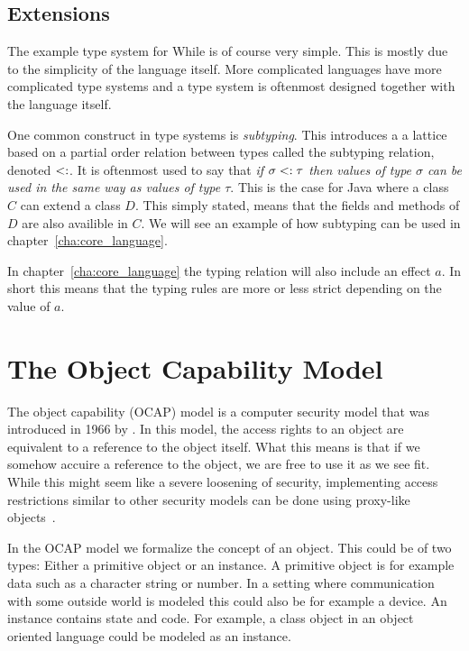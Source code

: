 \subsection{Extensions}
\label{sub:extensions}

The example type system for While is of course very simple. This is mostly due
to the simplicity of the language itself. More complicated languages have more
complicated type systems and a type system is oftenmost designed together 
with the language itself. 

One common construct in type systems is \emph{subtyping}. This introduces a a
lattice based on a partial order relation between types called the subtyping
relation, denoted $<:$.  It is oftenmost used to say that \emph{if $\sigma <:
\tau$ then values of type $\sigma$ can be used in the same way as values of type
$\tau$}. This is the case for Java where a class $C$ can extend a class $D$.
This simply stated, means that the fields and methods of $D$ are also availible
in $C$. We will see an example of how subtyping can be used in
chapter~\ref{cha:core_language}. 

In chapter~\ref{cha:core_language} the typing relation will also include an
effect $a$. In short this means that the typing rules are more or less strict
depending on the value of $a$.

\section{The Object Capability Model}%
\label{sec:the_object_capability_model}

The object capability (OCAP) model is a computer security model that was
introduced in 1966 by \textcite{Dennis-VanHorn66}. In this model, the access
rights to an object are equivalent to a reference to the object itself. What
this means is that if we somehow accuire a reference to the object, we are free
to use it as we see fit. While this might seem like a severe loosening of
security, implementing access restrictions similar to other security models can
be done using proxy-like objects~\parencite{Miller06b}.

In the OCAP model we formalize the concept of an object. This could be of
two types: Either a primitive object or an instance. A primitive object is
for example data such as a character string or number. In a setting where
communication with some outside world is modeled this could also be for example
a device. An instance contains state and code. For example, a class
object in an object oriented language could be modeled as an
instance.

